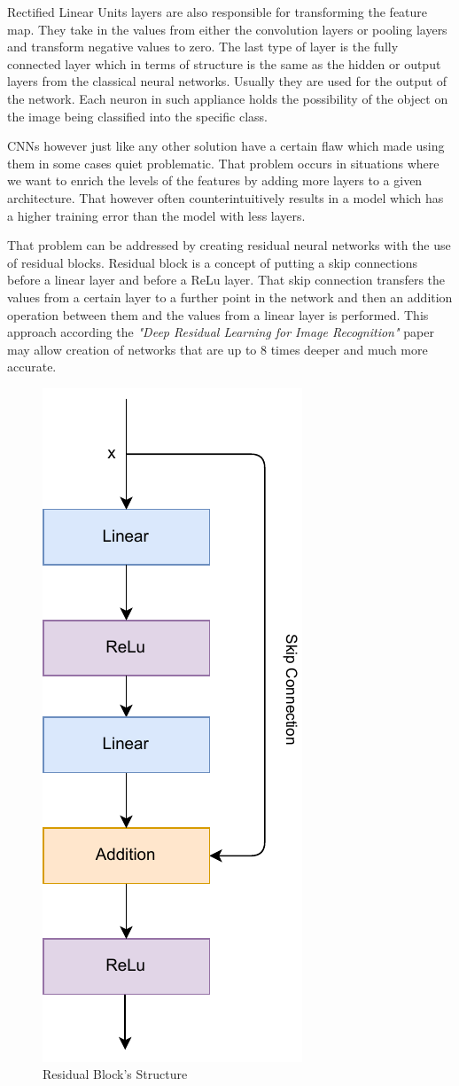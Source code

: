 \documentclass{ijisa}
\begin{document}
Rectified Linear Units layers are also responsible for transforming the feature map. They take in the values from either the convolution layers or pooling layers and transform negative values to zero. The last type of layer is the fully connected layer which in terms of structure is the same as the hidden or output layers from the classical neural networks. Usually they are used for the output of the network. Each neuron in such appliance holds the possibility of the object on the image being classified into the specific class.

CNNs however just like any other solution have a certain flaw which made using them in some cases quiet problematic. That problem occurs in situations where we want to enrich the levels of the features by adding more layers to a given architecture. That however often counterintuitively results in a model which has a higher training error than the model with less layers. 

That problem can be addressed by creating residual neural networks with the use of residual blocks. Residual block is a concept of putting a skip connections before a linear layer and before a ReLu layer. That skip connection transfers the values from a certain layer to a further point in the network and then an addition operation between them and the values from a linear layer is performed. This approach according the \textit{"Deep Residual Learning for Image Recognition"}\cite{he2016deep} paper may allow creation of  networks that are up to 8 times deeper and much more accurate.

\begin{figure}[!h]
\centering
\includegraphics[width=.4\columnwidth]{Images/residual_block.pdf}
\caption{Residual Block's Structure} \label{fig:fig4}
\end{figure}
\end{document}
